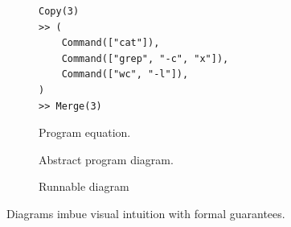 \documentclass[runningheads]{llncs}
\begin{document}
%          
\begin{figure}[htbp]
    \centering
    \begin{minipage}[c]{0.48\textwidth}
         \begin{subfigure}[b]{\textwidth}
             \centering
            \begin{verbatim}
Copy(3)
>> (
    Command(["cat"]),
    Command(["grep", "-c", "x"]),
    Command(["wc", "-l"]),
)
>> Merge(3)
            \end{verbatim}
             \caption{Program equation.}
         \end{subfigure}
        
        \vspace{0.5cm} %
        
        \begin{subfigure}{0.5\textwidth}
            \centering
            
            \caption{Abstract program diagram.}
            \label{fig:bottom_left}
        \end{subfigure}
    \end{minipage}
    \hfill
    \begin{minipage}[c]{0.45\textwidth}
        \begin{subfigure}{\textwidth}
            \centering
            
            \caption{Runnable diagram}
            \label{fig:right_side}
        \end{subfigure}
    \end{minipage}

    \caption{Diagrams imbue visual intuition with formal guarantees.}
    \label{fig:example1}
\end{figure}
\end{document}
